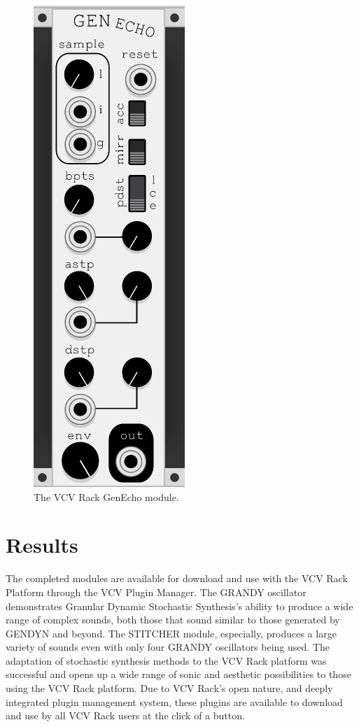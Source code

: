 \documentclass[10pt]{article}
\begin{document}
\begin{figure}
  \caption{The VCV Rack GenEcho module.}
  \centering
    \includegraphics[height=0.25\textheight]{genecho}
\end{figure}

\section{Results}
The completed modules are available for download and use with the VCV Rack Platform through the VCV Plugin Manager. The GRANDY oscillator demonstrates Granular Dynamic Stochastic Synthesis's ability to produce a wide range of complex sounds, both those that sound similar to those generated by GENDYN and beyond. The STITCHER module, especially, produces a large variety of sounds even with only four GRANDY oscillators being used. The adaptation of stochastic synthesis methods to the VCV Rack platform was successful and opens up a wide range of sonic and aesthetic possibilities to those using the VCV Rack platform. Due to VCV Rack's open nature, and deeply integrated plugin management system, these plugins are available to download and use by all VCV Rack users at the click of a button.
\end{document}
